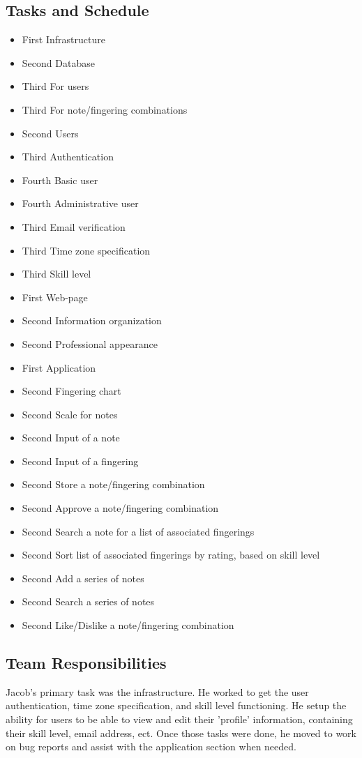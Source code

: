 \documentclass[12pt,english]{article}
\begin{document}
\subsection{Tasks and Schedule}
\begin{itemize}
\item First Infrastructure
\item Second Database
\item Third For users
\item Third For note/fingering combinations
\item Second Users
\item Third Authentication
\item Fourth Basic user
\item Fourth Administrative user
\item Third Email verification
\item Third Time zone specification
\item Third Skill level
\item First Web-page
\item Second Information organization
\item Second Professional appearance
\item First Application
\item Second Fingering chart
\item Second Scale for notes
\item Second Input of a note
\item Second Input of a fingering
\item Second Store a note/fingering combination
\item Second Approve a note/fingering combination
\item Second Search a note for a list of associated fingerings
\item Second Sort list of associated fingerings by rating, based on skill level
\item Second Add a series of notes
\item Second Search a series of notes
\item Second Like/Dislike a note/fingering combination
\end{itemize}

\subsection{Team Responsibilities}
Jacob's primary task was the infrastructure.  He worked to get the user
authentication, time zone specification, and skill level functioning.
He setup the ability for users to be able to view and edit their 'profile'
information, containing their skill level, email address, ect.  Once those
tasks were done, he moved to work on bug reports and assist with the application
section when needed.
\end{document}
